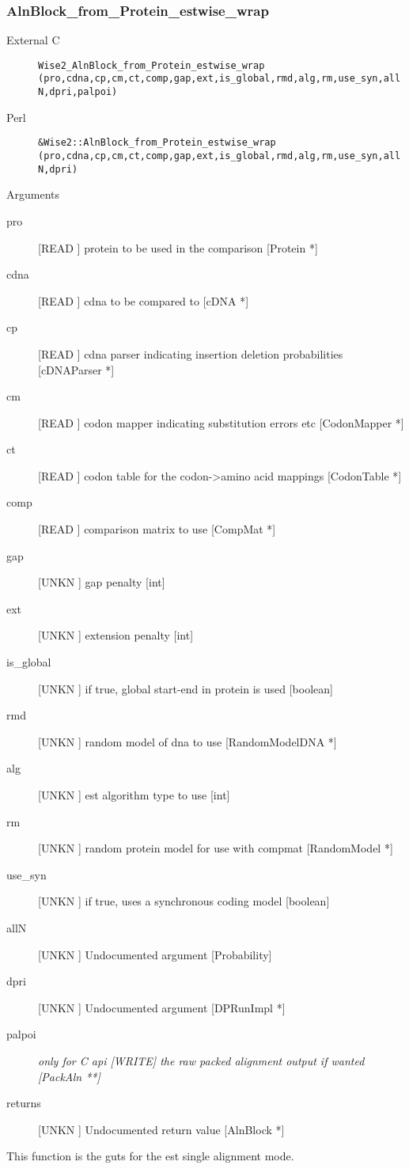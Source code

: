 \subsubsection{AlnBlock_from_Protein_estwise_wrap}
\begin{description}
\item[External C] {\tt Wise2_AlnBlock_from_Protein_estwise_wrap (pro,cdna,cp,cm,ct,comp,gap,ext,is_global,rmd,alg,rm,use_syn,allN,dpri,palpoi)}
\item[Perl] {\tt &Wise2::AlnBlock_from_Protein_estwise_wrap (pro,cdna,cp,cm,ct,comp,gap,ext,is_global,rmd,alg,rm,use_syn,allN,dpri)}

\end{description}
Arguments
\begin{description}
\item[pro] [READ ] protein to be used in the comparison [Protein *]
\item[cdna] [READ ] cdna to be compared to [cDNA *]
\item[cp] [READ ] cdna parser indicating insertion deletion probabilities [cDNAParser *]
\item[cm] [READ ] codon mapper indicating substitution errors etc [CodonMapper *]
\item[ct] [READ ] codon table for the codon->amino acid mappings [CodonTable *]
\item[comp] [READ ] comparison matrix to use [CompMat *]
\item[gap] [UNKN ] gap penalty [int]
\item[ext] [UNKN ] extension penalty [int]
\item[is_global] [UNKN ] if true, global start-end in protein is used [boolean]
\item[rmd] [UNKN ] random model of dna to use [RandomModelDNA *]
\item[alg] [UNKN ] est algorithm type to use [int]
\item[rm] [UNKN ] random protein model for use with compmat [RandomModel *]
\item[use_syn] [UNKN ] if true, uses a synchronous coding model [boolean]
\item[allN] [UNKN ] Undocumented argument [Probability]
\item[dpri] [UNKN ] Undocumented argument [DPRunImpl *]
\item[palpoi] \em{only for C api} [WRITE] the raw packed alignment output if wanted [PackAln **]
\item[returns] [UNKN ] Undocumented return value [AlnBlock *]
\end{description}
This function is the guts for the est single alignment
mode.


